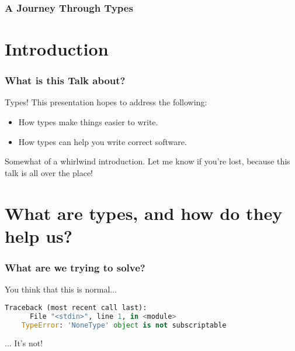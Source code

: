 \documentclass{beamer}
\author{
  Beck, Calvin\\
  \href{mailto:hobbes@ualberta.ca}{hobbes@ualberta.ca}
}
\begin{document}
\begin{frame}
  \frametitle{A Journey Through Types}
  \maketitle
\end{frame}

\section{Introduction}

\begin{frame}
  \frametitle{What is this Talk about?}

  Types! This presentation hopes to address the following:

  \begin{itemize}
  \item How types make things easier to write.
  \item How types can help you write correct software.
  \end{itemize}

  \pause

  Somewhat of a whirlwind introduction. Let me know if you're lost,
  because this talk is all over the place!
\end{frame}

\section{What are types, and how do they help us?}

\begin{frame}[fragile]
  \frametitle{What are we trying to solve?}

  You think that this is normal...

  \pause

  \begin{lstlisting}[frame=single, language=Python, breaklines=true]
    Traceback (most recent call last):
      File "<stdin>", line 1, in <module>
    TypeError: 'NoneType' object is not subscriptable
  \end{lstlisting}

  \pause

  \huge{... It's not!}
\end{frame}
\end{document}
